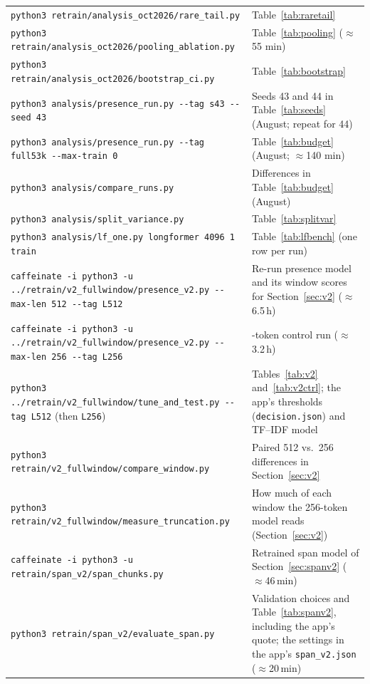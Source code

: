 {\begin{longtable}{>{\raggedright\arraybackslash}p{8.4cm} >{\raggedright\arraybackslash}p{5.6cm}}
\texttt{python3 retrain/analysis\_oct2026/\allowbreak rare\_tail.py} & Table~\ref{tab:raretail}\\
\texttt{python3 retrain/analysis\_oct2026/\allowbreak pooling\_ablation.py} & Table~\ref{tab:pooling} ($\approx$55 min)\\
\texttt{python3 retrain/analysis\_oct2026/\allowbreak bootstrap\_ci.py} & Table~\ref{tab:bootstrap}\\
\texttt{python3 analysis/presence\_run.py -{}-tag s43 -{}-seed 43} & Seeds 43 and 44 in Table~\ref{tab:seeds} (August; repeat for 44)\\
\texttt{python3 analysis/presence\_run.py -{}-tag full53k -{}-max-train 0} & Table~\ref{tab:budget} (August; $\approx$140 min)\\
\texttt{python3 analysis/compare\_runs.py} & Differences in Table~\ref{tab:budget} (August)\\
\texttt{python3 analysis/split\_variance.py} & Table~\ref{tab:splitvar}\\
\texttt{python3 analysis/lf\_one.py longformer 4096 1 train} & Table~\ref{tab:lfbench} (one row per run)\\
\texttt{caffeinate -i python3 -u ../retrain/v2\_fullwindow/\allowbreak presence\_v2.py -{}-max-len 512 -{}-tag L512} & Re-run presence model and its window scores for Section~\ref{sec:v2} ($\approx$6.5\,h)\\
\texttt{caffeinate -i python3 -u ../retrain/v2\_fullwindow/\allowbreak presence\_v2.py -{}-max-len 256 -{}-tag L256} & 256-token control run ($\approx$3.2\,h)\\
\texttt{python3 ../retrain/v2\_fullwindow/\allowbreak tune\_and\_test.py -{}-tag L512} (then \texttt{L256}) & Tables~\ref{tab:v2} and~\ref{tab:v2ctrl}; the app's thresholds (\texttt{decision.json}) and TF--IDF model\\
\texttt{python3 retrain/v2\_fullwindow/\allowbreak compare\_window.py} & Paired 512 vs.\ 256 differences in Section~\ref{sec:v2}\\
\texttt{python3 retrain/v2\_fullwindow/\allowbreak measure\_truncation.py} & How much of each window the 256-token model reads (Section~\ref{sec:v2})\\
\texttt{caffeinate -i python3 -u retrain/span\_v2/\allowbreak span\_chunks.py} & Retrained span model of Section~\ref{sec:spanv2} ($\approx$46\,min)\\
\texttt{python3 retrain/span\_v2/\allowbreak evaluate\_span.py} & Validation choices and Table~\ref{tab:spanv2}, including the app's quote; the settings in the app's \texttt{span\_v2.json} ($\approx$20\,min)\\

\end{longtable}}
